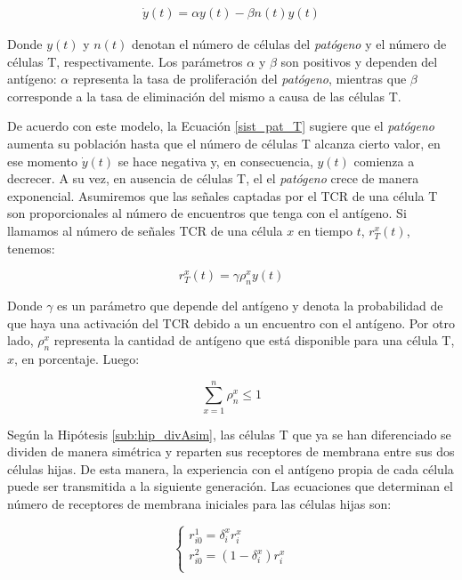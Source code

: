 \begin{equation}
	\label{sist_pat_T}
	\begin{array}{ll}
	\dot{y}(t) = \alpha y(t) - \beta n(t)y(t)
	\end{array}
\end{equation} 

Donde $y(t)$ y $n(t)$ denotan el número de células del \textit{patógeno} y el número de células T, respectivamente. Los parámetros $\alpha$ y $\beta$ son positivos y dependen del antígeno: $\alpha$ representa la tasa de proliferación del \textit{patógeno}, mientras que $\beta$ corresponde a la tasa de eliminación del mismo a causa de las células T.

De acuerdo con este modelo, la Ecuación \ref{sist_pat_T} sugiere que el \textit{patógeno} aumenta su población hasta que el número de células T alcanza cierto valor, en ese momento $\dot{y}(t)$ se hace negativa y, en consecuencia, $y(t)$ comienza a decrecer. A su vez, en ausencia de células T, el el \textit{patógeno} crece de manera exponencial. Asumiremos que las señales captadas por el TCR de una célula T son proporcionales al número de encuentros que tenga con el antígeno. Si llamamos al número de señales TCR de una célula $x$ en tiempo $t$, $r_{T}^{x}(t)$, tenemos:

\begin{equation}
	\label{ec:rhotau}
	r_{T}^{x}(t) = \gamma\rho_{n}^{x}y(t)
\end{equation}

Donde $\gamma$ es un parámetro que depende del antígeno y denota la probabilidad de que haya una activación del TCR debido a un encuentro con el antígeno. Por otro lado, $\rho_{n}^{x}$ representa la cantidad de antígeno que está disponible para una célula T, $x$, en porcentaje. Luego:

\begin{equation}
	\sum_{x=1}^{n} \rho_{n}^{x} \leq 1
\end{equation}

Según la Hipótesis \ref{sub:hip_divAsim}, las células T que ya se han diferenciado se dividen de manera simétrica y reparten sus receptores de membrana entre sus dos células hijas. De esta manera, la experiencia con el antígeno propia de cada célula puede ser transmitida a la siguiente generación. Las ecuaciones que determinan el número de receptores de membrana iniciales para las células hijas son:

\begin{equation}
	\label{sist:div_sim}
	\left\{ \begin{array}{l}
	r_{i0}^{1}= \delta_{i}^{x} r_{i}^{x}\\
	r_{i0}^{2}= (1-\delta_{i}^{x}) r_{i}^{x} \\
	\end{array}
	\right.
\end{equation}



